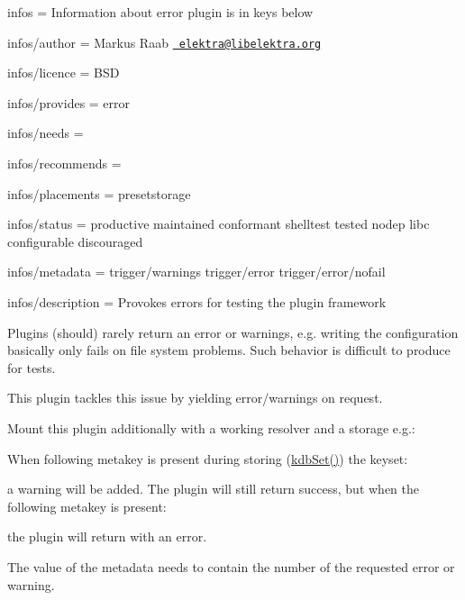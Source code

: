 
\begin{DoxyItemize}
\item infos = Information about error plugin is in keys below
\item infos/author = Markus Raab \href{mailto:elektra@libelektra.org}{\texttt{ elektra@libelektra.\+org}}
\item infos/licence = B\+SD
\item infos/provides = error
\item infos/needs =
\item infos/recommends =
\item infos/placements = presetstorage
\item infos/status = productive maintained conformant shelltest tested nodep libc configurable discouraged
\item infos/metadata = trigger/warnings trigger/error trigger/error/nofail
\item infos/description = Provokes errors for testing the plugin framework
\end{DoxyItemize}

Plugins (should) rarely return an error or warnings, e.\+g. writing the configuration basically only fails on file system problems. Such behavior is difficult to produce for tests.

This plugin tackles this issue by yielding error/warnings on request.

Mount this plugin additionally with a working resolver and a storage e.\+g.\+:


\begin{DoxyCode}{0}
\end{DoxyCode}


When following metakey is present during storing ({\ttfamily \mbox{\hyperlink{group__kdb_ga11436b058408f83d303ca5e996832bcf}{kdb\+Set()}}}) the keyset\+:


\begin{DoxyCode}{0}
\end{DoxyCode}


a warning will be added. The plugin will still return success, but when the following metakey is present\+:


\begin{DoxyCode}{0}
\end{DoxyCode}


the plugin will return with an error.

The value of the metadata needs to contain the number of the requested error or warning.

